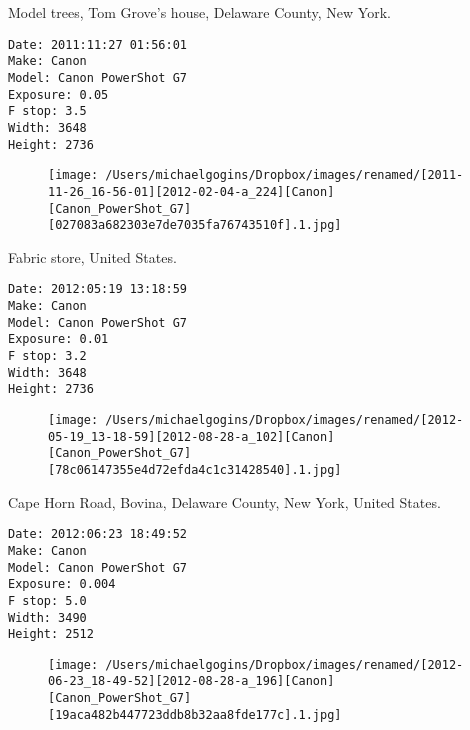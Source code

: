\documentclass[11pt,letter,DIV=14,paper=landscape]{scrbook}
\begin{document}
\clearpage
\noindent Model trees, Tom Grove's house, Delaware County, New York.
\noindent
\begin{lstlisting}
Date: 2011:11:27 01:56:01
Make: Canon
Model: Canon PowerShot G7
Exposure: 0.05
F stop: 3.5
Width: 3648
Height: 2736
\end{lstlisting}
\clearpage

\begin{figure}
\texttt{[image: /Users/michaelgogins/Dropbox/images/renamed/[2011-11-26\_16-56-01][2012-02-04-a\_224][Canon][Canon\_PowerShot\_G7][027083a682303e7de7035fa76743510f].1.jpg]}
\end{figure}
    
\clearpage
\noindent Fabric store, United States.
\noindent
\begin{lstlisting}
Date: 2012:05:19 13:18:59
Make: Canon
Model: Canon PowerShot G7
Exposure: 0.01
F stop: 3.2
Width: 3648
Height: 2736
\end{lstlisting}
\clearpage

\begin{figure}
\texttt{[image: /Users/michaelgogins/Dropbox/images/renamed/[2012-05-19\_13-18-59][2012-08-28-a\_102][Canon][Canon\_PowerShot\_G7][78c06147355e4d72efda4c1c31428540].1.jpg]}
\end{figure}
    
\clearpage
\noindent Cape Horn Road, Bovina, Delaware County, New York, United States.
\noindent
\begin{lstlisting}
Date: 2012:06:23 18:49:52
Make: Canon
Model: Canon PowerShot G7
Exposure: 0.004
F stop: 5.0
Width: 3490
Height: 2512
\end{lstlisting}
\clearpage

\begin{figure}
\texttt{[image: /Users/michaelgogins/Dropbox/images/renamed/[2012-06-23\_18-49-52][2012-08-28-a\_196][Canon][Canon\_PowerShot\_G7][19aca482b447723ddb8b32aa8fde177c].1.jpg]}
\end{figure}
    
\end{document}
